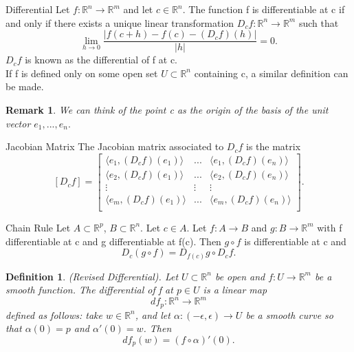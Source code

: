 \documentclass[twoside]{article}
\newtheorem{definition}[theorem]{Definition}
\newtheorem{remark}[theorem]{Remark}
\begin{document}
\begin{definition_exam}{Differential}{} Let $f: \mathbb{R}^n \rightarrow \mathbb{R}^m$ and let $c \in \mathbb{R}^n.$ The function f is differentiable at c if and only if there exists a unique linear transformation $D_cf: \mathbb{R}^n \rightarrow \mathbb{R}^m$ such that 
$$
\lim_{h \rightarrow 0}\frac{|f(c+h) - f(c) - (D_cf)(h)|}{|h|} = 0.
$$
$D_cf$ is known as the differential of f at c.\\ If f is defined only on some open set $U \subset \mathbb{R}^n$ containing c, a similar definition can be made.
\end{definition_exam}

\begin{remark}We can think of the point c as the origin of the basis of the unit vector $e_1,...,e_n.$
\end{remark}

\begin{definition_exam}{Jacobian Matrix}{} The Jacobian matrix associated to $D_cf$ is the matrix 
$$[D_cf] = 
\begin{bmatrix}
\langle e_1, (D_cf)(e_1) \rangle  & ... & \langle e_1, (D_cf)(e_n) \rangle\\
\langle e_2, (D_cf)(e_1) \rangle  & ... & \langle e_2, (D_cf)(e_n) \rangle\\
\vdots & \vdots & \vdots \\
\langle e_m, (D_cf)(e_1) \rangle  & ... & \langle e_m, (D_cf)(e_n) \rangle\\
\end{bmatrix}.
$$
\end{definition_exam}

\begin{theorem_exam}{Chain Rule}{} Let $A \subset \mathbb{R}^p$, $B \subset \mathbb{R}^n$. Let $c \in A$. Let $f: A \rightarrow B$ and $g: B \rightarrow \mathbb{R}^m$ with f differentiable at c and g differentiable at f(c). Then $g \circ f$ is differentiable at c and 
$$
D_c(g \circ f) = D_{f(c)}g \circ D_cf.
$$
\end{theorem_exam}


\begin{definition}(Revised Differential). Let $U \subset \mathbb{R}^n$ be open and $f: U \rightarrow \mathbb{R}^m$ be a smooth function. The differential of f at $p \in U$ is a linear map 
$$
df_p: \mathbb{R}^n \rightarrow \mathbb{R}^m
$$
defined as follows: take $w \in \mathbb{R}^n$, and let $\alpha: (-\epsilon, \epsilon) \rightarrow U$ be a smooth curve so that $\alpha(0) = p$ and $\alpha'(0) = w$. Then 
$$
df_p(w) = (f \circ \alpha)'(0).
$$
\end{definition}
\end{document}
